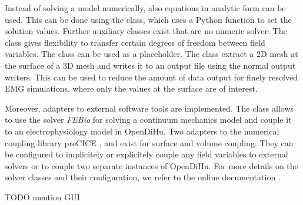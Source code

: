 Instead of solving a model numerically, also equations in analytic form can be used. This can be done using the  class, which uses a Python function to set the solution values. Further auxiliary classes exist that are no numeric solver: The  class gives flexibility to transfer certain degrees of freedom between field variables. The  class can be used as a placeholder. The  class extract a 2D mesh at the surface of a 3D mesh and writes it to an output file using the normal output writers. This can be used to reduce the amount of data output for finely resolved EMG simulations, where only the values at the surface are of interest.

Moreover, adapters to external software tools are implemented. The class  allows to use the solver \emph{FEBio} \cite{Maas2012,maas2017febio} for solving a continuum mechanics model and couple it to an electrophysiology model in OpenDiHu.
Two adapters to the numerical coupling library preCICE \cite{precice},  and  exist for surface and volume coupling. They can be configured to implicitely or explicitely couple any field variables to external solvers or to couple two separate instances of OpenDiHu.
For more details on the solver classes and their configuration, we refer to the online documentation \cite{opendihuWeb}.

TODO mention GUI



